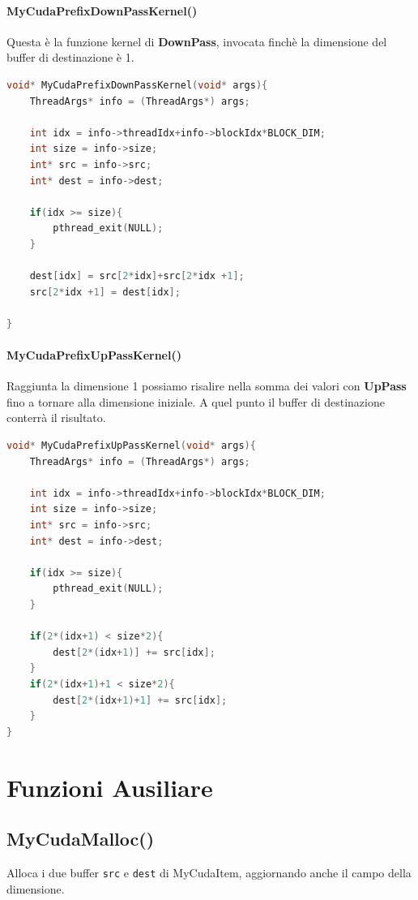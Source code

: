 \documentclass[binding=0.6cm, noexaminfo]{sapthesis}\usepackage{microtype}
\begin{document}
\paragraph{MyCudaPrefixDownPassKernel()}
Questa è la funzione kernel di \textbf{DownPass}, invocata finchè la dimensione del buffer di destinazione è 1. 

\begin{lstlisting}[language=C]
void* MyCudaPrefixDownPassKernel(void* args){
    ThreadArgs* info = (ThreadArgs*) args;

    int idx = info->threadIdx+info->blockIdx*BLOCK_DIM;
    int size = info->size;
    int* src = info->src;
    int* dest = info->dest;
        
    if(idx >= size){
        pthread_exit(NULL);
    }

    dest[idx] = src[2*idx]+src[2*idx +1];
    src[2*idx +1] = dest[idx];

}
\end{lstlisting}

\paragraph{MyCudaPrefixUpPassKernel()}
Raggiunta la dimensione 1 possiamo risalire nella somma dei valori con \textbf{UpPass} fino a tornare alla dimensione iniziale. A quel punto il buffer di destinazione conterrà il risultato.

\begin{lstlisting}[language=C]
void* MyCudaPrefixUpPassKernel(void* args){
    ThreadArgs* info = (ThreadArgs*) args;

    int idx = info->threadIdx+info->blockIdx*BLOCK_DIM;
    int size = info->size;
    int* src = info->src;
    int* dest = info->dest;
        
    if(idx >= size){
        pthread_exit(NULL);
    }

    if(2*(idx+1) < size*2){
        dest[2*(idx+1)] += src[idx];
    }
    if(2*(idx+1)+1 < size*2){
        dest[2*(idx+1)+1] += src[idx];
    }
}
\end{lstlisting}


\section{Funzioni Ausiliare}

\subsection{MyCudaMalloc()}
Alloca i due buffer \texttt{src} e \texttt{dest} di MyCudaItem, aggiornando anche il campo della dimensione. 
\end{document}
